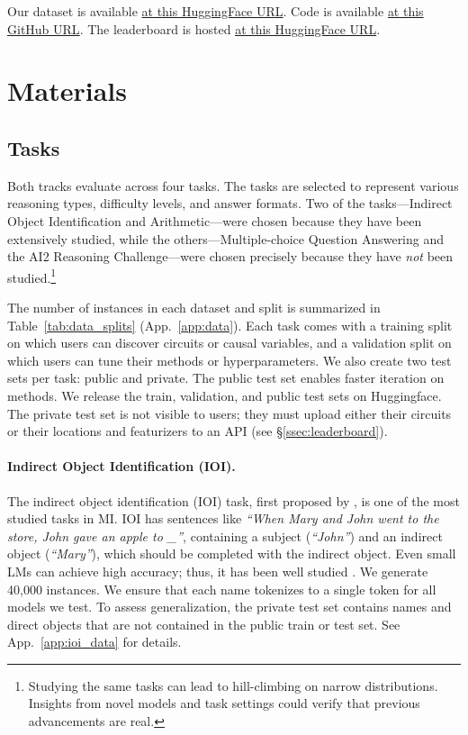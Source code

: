 \documentclass{article}
\theoremstyle{plain}
\theoremstyle{definition}
\theoremstyle{remark}
\newcommand{\arxiv}[1]{#1}
\begin{document}
Our dataset is available \href{https://huggingface.co/collections/mib-bench/mib-datasets-67f55273612ec3067a42a56b}{at this HuggingFace URL}. Code is available \href{https://github.com/aaronmueller/mib}{at this GitHub URL}. The leaderboard is hosted \href{https://huggingface.co/spaces/mib-bench/leaderboard}{at this HuggingFace URL}.

\section{Materials}
\label{sec:materials}
\subsection{Tasks}\label{sec:tasks}

Both tracks evaluate across four tasks. The tasks are selected to represent various reasoning types, difficulty levels, and answer formats. Two of the tasks---Indirect Object Identification and Arithmetic---were chosen because they have been extensively studied, while the others---Multiple-choice Question Answering and the AI2 Reasoning Challenge---were chosen precisely because they have \emph{not} been studied.\footnote{Studying the same tasks can lead to hill-climbing on narrow distributions. Insights from novel models and task settings could verify that previous advancements are real.}

The number of instances in each dataset and split is summarized in Table~\ref{tab:data_splits} (App.~\ref{app:data}). Each task comes with a training split on which users can discover circuits or causal variables, and a validation split on which users can tune their methods or hyperparameters. We also create two test sets per task: public and private. The public test set enables faster iteration on methods. We release the train, validation, and public test sets on Huggingface. The private test set is not visible to users; they must upload either their circuits or their locations and featurizers to an API (see \S\ref{ssec:leaderboard}).

\paragraph{Indirect Object Identification (IOI).}

The indirect object identification (IOI) task, first proposed by \citet{wang2022interpretability}, is one of the most studied  tasks in MI. 
IOI has sentences like \textit{``When Mary and John went to the store, John gave an apple to \_''}, containing a subject (\textit{``John''}) and an indirect object (\textit{``Mary''}), which should be completed with the indirect object. 
Even small LMs can achieve high accuracy; thus, it has been well studied \cite{cunningham2023sparse, conmy2023towards, merullo2023circuit}. We generate 40,000 instances. \arxiv{We ensure that each name tokenizes to a single token for all models we test. To assess generalization, the private test set contains names and direct objects that are not contained in the public train or test set.}
See App.~\ref{app:ioi_data} for details.
\end{document}
